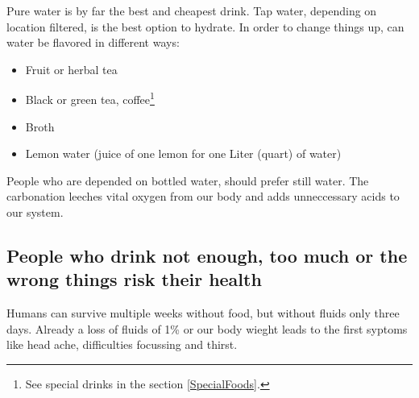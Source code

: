 \documentclass[../main.tex]{subfiles}
\begin{document}
  
  Pure water is by far the best and cheapest drink. Tap water, depending on location filtered, is the best option to hydrate.
  In order to change things up, can water be flavored in different ways:
  \begin{itemize}
  \item Fruit or herbal tea
  \item Black or green tea, coffee\footnote{See special drinks in the section \ref{SpecialFoods}.}
  \item Broth
    \item Lemon water (juice of one lemon for one Liter (quart) of water)
  \end{itemize}

  People who are depended on bottled water, should prefer still water.
  The carbonation leeches vital oxygen from our body and adds unneccessary acids to our system.

  \subsection[Drinking too little, too much or the wrong drinks]{People who drink not enough, too much or the wrong things risk their health}

  Humans can survive multiple weeks without food, but without fluids only three days.
  Already a loss of fluids of 1\% or our body wieght leads to the first syptoms like head ache, difficulties focussing and thirst.
  
\end{document}
